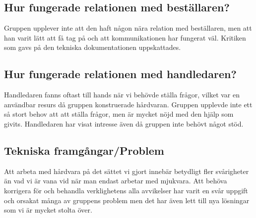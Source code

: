 \documentclass{article}
\begin{document}
\subsection{Hur fungerade relationen med beställaren?}
Gruppen upplever inte att den haft någon nära relation med beställaren, men att han varit lätt att få tag på och att kommunikationen har fungerat väl. Kritiken som gavs på den tekniska dokumentationen uppskattades. 

\subsection{Hur fungerade relationen med handledaren?}
Handledaren fanns oftast till hands när vi behövde ställa frågor, vilket var en användbar resurs då gruppen konstruerade hårdvaran. Gruppen upplevde inte ett så stort behov att att ställa frågor, men är mycket nöjd med den hjälp som givits. Handledaren har visat intresse även då gruppen inte behövt något stöd.

\subsection{Tekniska framgångar/Problem}
Att arbeta med hårdvara på det sättet vi gjort innebär betydligt fler svårigheter än vad vi är vana vid när man endast arbetar med mjukvara. Att behöva korrigera för och behandla verklighetens alla avvikelser har varit en svår uppgift och orsakat många av gruppens problem men det har även lett till nya lösningar som vi är mycket stolta över.
\end{document}
